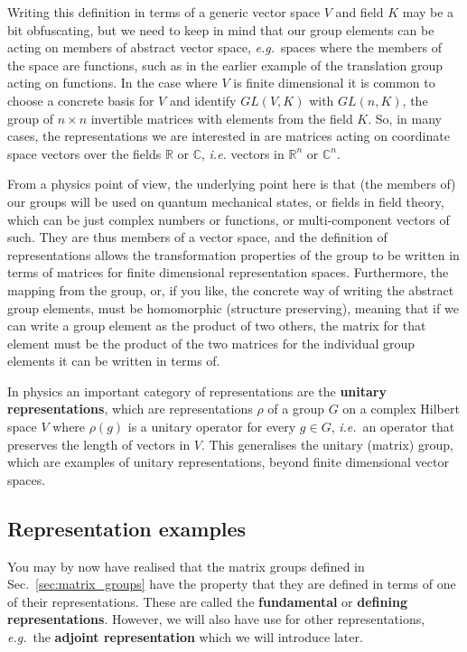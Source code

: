 \documentclass[notes.tex]{subfiles}
\begin{document}
Writing this definition in terms of a generic vector space $V$ and field $K$ may be a bit obfuscating, but we need to keep in mind that our group elements can be acting on members of abstract vector space, {\it e.g.}\ spaces where the members of the space are functions, such as in the earlier example of the translation group acting on functions. In the case where $V$ is finite dimensional it is common to choose a concrete basis for $V$ and identify $GL(V,K)$ with $GL(n, K)$, the group of $n\times n$ invertible matrices with elements from the field $K$. So, in many cases, the representations we are interested in are matrices acting on coordinate space vectors over the fields $\mathbb R$ or $\mathbb C$, {\it i.e.} vectors in $\mathbb R^n$ or $\mathbb C^n$.

From a physics point of view, the underlying point here is that (the members of) our groups will be used on quantum mechanical states, or fields in field theory, which can be just complex numbers or functions, or multi-component vectors of such. They are thus members of a vector space, and the definition of representations allows the transformation properties of the group to be written in terms of matrices for finite dimensional representation spaces. Furthermore, the mapping from the group, or, if you like, the concrete way of writing the abstract group elements, must be homomorphic (structure preserving), meaning that if we can write a group element as the product of two others, the matrix for that element must be the product of the two matrices for the individual group elements it can be written in terms of.


In physics an important category of representations are the {\bf unitary representations}, which are representations $\rho$ of a group $G$ on a complex Hilbert space $V$ where $\rho(g)$ is a unitary operator for every $g\in G$, {\it i.e.}\ an operator that preserves the length of vectors in $V$. This generalises the unitary (matrix) group, which are examples of unitary representations, beyond finite dimensional vector spaces.


\subsection{Representation examples}
You may by now have realised that the matrix groups defined in Sec.~\ref{sec:matrix_groups} have the property that they are defined in terms of one of their representations. These are called the {\bf fundamental} or {\bf defining  representations}. However, we will also have use for other representations, {\it e.g.}\ the {\bf adjoint representation} which we will introduce later.
\end{document}
